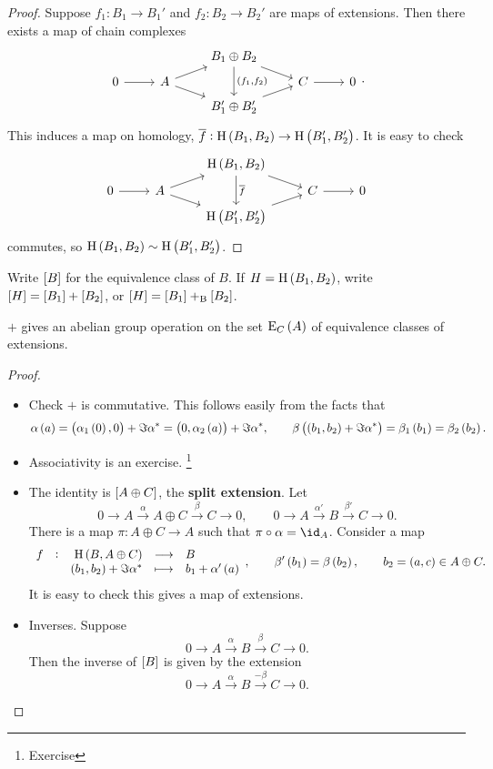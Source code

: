 \begin{proof}
Suppose $ f_1 : B_1 \to B_1' $ and $ f_2 : B_2 \to B_2' $ are maps of extensions. Then there exists a map of chain complexes
$$
\begin{tikzcd}[row sep=tiny]
& & B_1 \oplus B_2 \arrow{dr} \arrow{dd}{\br{f_1, f_2}} & & \\
0 \arrow{r} & A \arrow{ur} \arrow[swap]{dr} & & C \arrow{r} & 0 \\
& & B_1' \oplus B_2' \arrow[swap]{ur} & &
\end{tikzcd}.
$$
This induces a map on homology, $ \overline{f} : \H\br{B_1, B_2} \to \H\br{B_1', B_2'} $. It is easy to check
$$
\begin{tikzcd}[row sep=tiny]
& & \H\br{B_1, B_2} \arrow{dr} \arrow{dd}{\overline{f}} & & \\
0 \arrow{r} & A \arrow{ur} \arrow[swap]{dr} & & C \arrow{r} & 0 \\
& & \H\br{B_1', B_2'} \arrow[swap]{ur} & &
\end{tikzcd}
$$
commutes, so $ \H\br{B_1, B_2} \sim \H\br{B_1', B_2'} $.
\end{proof}

Write $ \sbr{B} $ for the equivalence class of $ B $. If $ H = \H\br{B_1, B_2} $, write $ \sbr{H} = \sbr{B_1} + \sbr{B_2} $, or $ \sbr{H} = \sbr{B_1} +_\B \sbr{B_2} $.

\begin{proposition}
$ + $ gives an abelian group operation on the set $ \E_C\br{A} $ of equivalence classes of extensions.
\end{proposition}

\begin{proof}
\hfill
\begin{itemize}
\item Check $ + $ is commutative. This follows easily from the facts that
$$ \alpha\br{a} = \br{\alpha_1\br{0}, 0} + \Im \alpha^* = \br{0, \alpha_2\br{a}} + \Im \alpha^*, \qquad \beta\br{\br{b_1, b_2} + \Im \alpha^*} = \beta_1\br{b_1} = \beta_2\br{b_2}. $$
\item Associativity is an exercise. \footnote{Exercise}
\item The identity is $ \sbr{A \oplus C} $, the \textbf{split extension}. Let
$$ 0 \to A \xrightarrow{\alpha} A \oplus C \xrightarrow{\beta} C \to 0, \qquad 0 \to A \xrightarrow{\alpha'} B \xrightarrow{\beta'} C \to 0. $$
There is a map $ \pi : A \oplus C \to A $ such that $ \pi \circ \alpha = \id_A $. Consider a map
$$ \function[f]{\H\br{B, A \oplus C}}{B}{\br{b_1, b_2} + \Im \alpha^*}{b_1 + \alpha'\br{a}}, \qquad \beta'\br{b_1} = \beta\br{b_2}, \qquad b_2 = \br{a, c} \in A \oplus C. $$
It is easy to check this gives a map of extensions.

\pagebreak

\item Inverses. Suppose
$$ 0 \to A \xrightarrow{\alpha} B \xrightarrow{\beta} C \to 0. $$
Then the inverse of $ \sbr{B} $ is given by the extension
$$ 0 \to A \xrightarrow{\alpha} B \xrightarrow{-\beta} C \to 0. $$
\end{itemize}
\end{proof}

